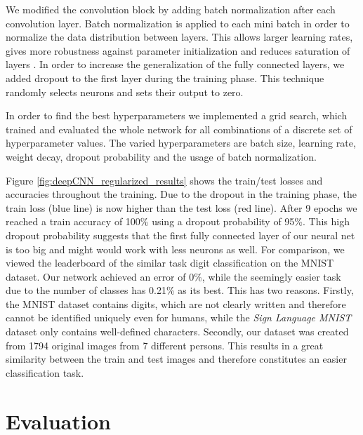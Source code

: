 \documentclass[a4paper]{article}
\begin{document}
We modified the convolution block by adding batch normalization \cite{ioffe2015batch} after each convolution layer. Batch normalization is applied to each mini batch in order to normalize the data distribution between layers. This allows larger learning rates, gives more robustness against parameter initialization and reduces saturation of layers \cite{ioffe2015batch}. In order to increase the generalization of the fully connected layers, we added dropout to the first layer during the training phase. This technique randomly selects neurons and sets their output to zero. 

In order to find the best hyperparameters we implemented a grid search, which trained and evaluated the whole network for all combinations of a discrete set of hyperparameter values. The varied hyperparameters are batch size, learning rate, weight decay, dropout probability and the usage of batch normalization.

Figure \ref{fig:deepCNN_regularized_results} shows the train/test losses and accuracies throughout the training. Due to the dropout in the training phase, the train loss (blue line) is now higher than the test loss (red line). After 9 epochs we reached a train accuracy of 100\% using a dropout probability of 95\%. This high dropout probability suggests that the first fully connected layer of our neural net is too big and might would work with less neurons as well. For comparison, we viewed the leaderboard of the similar task digit classification on the MNIST dataset. Our network achieved an error of 0\%, while the seemingly easier task due to the number of classes has 0.21\% as its best. This has two reasons. Firstly, the MNIST dataset contains digits, which are not clearly written and therefore cannot be identified uniquely even for humans, while the \textit{Sign Language MNIST} dataset only contains well-defined characters. Secondly, our dataset was created from 1794 original images from 7 different persons. This results in a great similarity between the train and test images and therefore constitutes an easier classification task.

\section{Evaluation}
\label{ch:evaluation}
\end{document}
